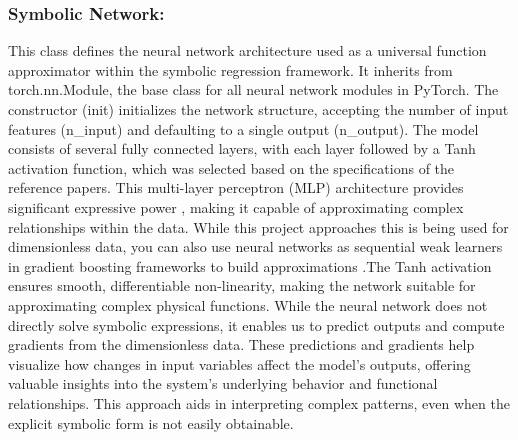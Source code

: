 \documentclass{article}
\begin{document}
\subsubsection{Symbolic Network:}


This class defines the neural network architecture used as a universal function approximator within the symbolic regression framework. It inherits from torch.nn.Module, the base class for all neural network modules in PyTorch. The constructor (init) initializes the network structure, accepting the number of input features (n\_input) and defaulting to a single output (n\_output). The model consists of several fully connected layers, with each layer followed by a Tanh activation function, which was selected based on the specifications of the reference papers. This multi-layer perceptron (MLP) architecture provides significant expressive power \cite{abdellaoui2021}, making it capable of approximating complex relationships within the data. While this project approaches this is being used for dimensionless data, you can also use neural networks as sequential weak learners in gradient boosting frameworks to build approximations \cite{badirli2020}.The Tanh activation ensures smooth, differentiable non-linearity, making the network suitable for approximating complex physical functions. While the neural network does not directly solve symbolic expressions, it enables us to predict outputs and compute gradients from the dimensionless data. These predictions and gradients help visualize how changes in input variables affect the model's outputs, offering valuable insights into the system's underlying behavior and functional relationships. This approach aids in interpreting complex patterns, even when the explicit symbolic form is not easily obtainable.\\
\end{document}
